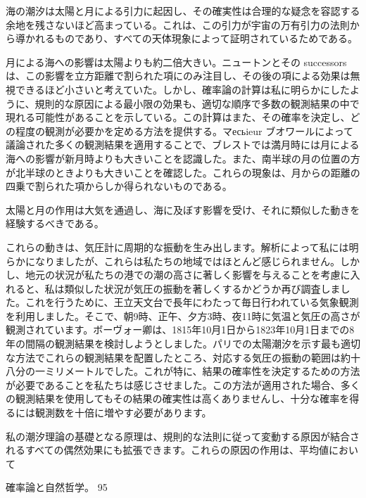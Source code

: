 \documentclass[a4paper,11pt,openany]{ltjsbook}
\begin{document}
海の潮汐は太陽と月による引力に起因し、その確実性は合理的な疑念を容認する余地を残さないほど高まっている。これは、この引力が宇宙の万有引力の法則から導かれるものであり、すべての天体現象によって証明されているためである。

月による海への影響は太陽よりも約二倍大きい。ニュートンとその successors は、この影響を立方距離で割られた項にのみ注目し、その後の項による効果は無視できるほど小さいと考えていた。しかし、確率論の計算は私に明らかにしたように、規則的な原因による最小限の効果も、適切な順序で多数の観測結果の中で現れる可能性があることを示している。この計算はまた、その確率を決定し、どの程度の観測が必要かを定める方法を提供する。マесьieur ブオワールによって議論された多くの観測結果を適用することで、ブレストでは満月時には月による海への影響が新月時よりも大きいことを認識した。また、南半球の月の位置の方が北半球のときよりも大きいことを確認した。これらの現象は、月からの距離の四乗で割られた項からしか得られないものである。

太陽と月の作用は大気を通過し、海に及ぼす影響を受け、それに類似した動きを経験するべきである。

これらの動きは、気圧計に周期的な振動を生み出します。解析によって私には明らかになりましたが、これらは私たちの地域ではほとんど感じられません。しかし、地元の状況が私たちの港での潮の高さに著しく影響を与えることを考慮に入れると、私は類似した状況が気圧の振動を著しくするかどうか再び調査しました。これを行うために、王立天文台で長年にわたって毎日行われている気象観測を利用しました。そこで、朝9時、正午、夕方3時、夜11時に気温と気圧の高さが観測されています。ボーヴォー卿は、1815年10月1日から1823年10月1日までの8年の間隔の観測結果を検討しようとしました。パリでの太陽潮汐を示す最も適切な方法でこれらの観測結果を配置したところ、対応する気圧の振動の範囲は約十八分の一ミリメートルでした。これが特に、結果の確率性を決定するための方法が必要であることを私たちは感じさせました。この方法が適用された場合、多くの観測結果を使用してもその結果の確実性は高くありませんし、十分な確率を得るには観測数を十倍に増やす必要があります。

私の潮汐理論の基礎となる原理は、規則的な法則に従って変動する原因が結合されるすべての偶然効果にも拡張できます。これらの原因の作用は、平均値において

確率論と自然哲学。         95
\end{document}
